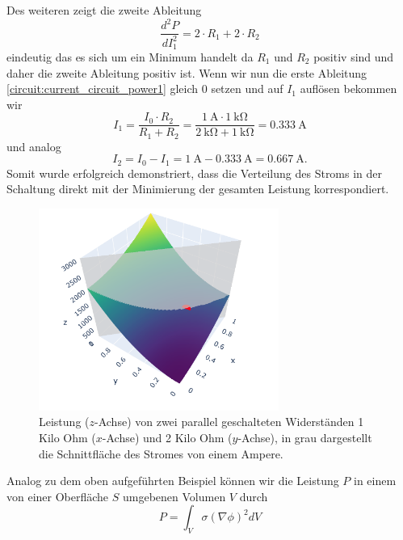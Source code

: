 Des weiteren zeigt die zweite Ableitung 
\begin{equation}
	\frac{d^2P}{dI_1^2} = 2\cdot R_1 + 2\cdot R_2
	\label{circuit:current_circuit_power2}
\end{equation}
eindeutig das es sich um ein Minimum handelt da $R_1$ und $R_2$ positiv sind und daher die zweite Ableitung positiv ist. Wenn wir nun die erste Ableitung \eqref{circuit:current_circuit_power1} gleich 0 setzen und auf $I_1$ auflösen bekommen wir
\begin{equation}
	I_1 = \frac{I_0 \cdot R_2}{R_1 + R_2} = \frac{\SI{1}{\ampere} \cdot \SI{1}{\kilo\ohm}}{\SI{2}{\kilo\ohm}+ \SI{1}{\kilo\ohm}}=\SI{0.333}{\ampere}
	\label{circuit:current_circuit_power3}
\end{equation}
und analog
\begin{equation}
	I_2 = I_0-I_1=\SI{1}{\ampere}-\SI{0.333}{\ampere}=\SI{0.667}{\ampere}.
	\label{circuit:current_circuit_power4}
\end{equation}
Somit wurde erfolgreich demonstriert, dass die Verteilung des Stroms in der Schaltung direkt mit der Minimierung der gesamten Leistung korrespondiert.
\begin{figure}
	\centering
	\includegraphics[width=0.7\textwidth]{papers/circuit/two_parrallel_resistors.png}
	\caption{Leistung ($z$-Achse) von zwei parallel geschalteten Widerständen 1 Kilo Ohm ($x$-Achse) und 2 Kilo Ohm ($y$-Achse), in grau dargestellt die Schnittfläche des Stromes von einem Ampere.}
	\label{fig:circuit_power}
\end{figure}
Analog zu dem oben aufgeführten Beispiel können wir die Leistung $P$ in einem von einer Oberfläche $S$ umgebenen Volumen $V$ durch 
\begin{equation}
	P=\int_V \sigma(\nabla \phi)^2 d V
	\label{circuit:current_density_7}
\end{equation}
